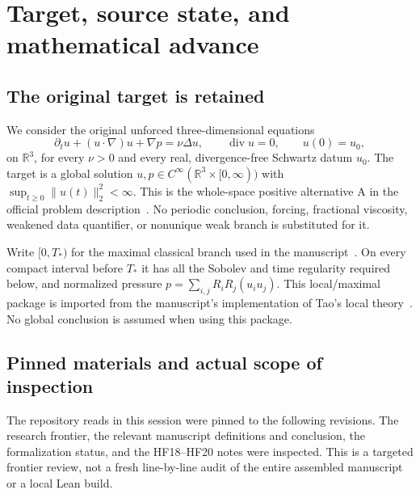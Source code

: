 \documentclass[11pt,a4paper]{article}
\theoremstyle{definition}
\newcommand{\R}{\mathbb R}
\DeclareMathOperator{\diver}{div}
\begin{document}
\begingroup
\small
\setlength{\parskip}{0pt}
\tableofcontents
\endgroup
\newpage

\section{Target, source state, and mathematical advance}\label{sec:provenance}

\subsection{The original target is retained}
We consider the original unforced three-dimensional equations
\begin{equation}\label{eq:NS}
 \partial_tu+(u\cdot\nabla)u+\nabla p=\nu\Delta u,
 \qquad \diver u=0,\qquad u(0)=u_0,
\end{equation}
on $\R^3$, for every $\nu>0$ and every real, divergence-free Schwartz datum $u_0$. The target is a global solution $u,p\in C^\infty(\R^3\times[0,\infty))$ with $\sup_{t\ge0}\|u(t)\|_2^2<\infty$. This is the whole-space positive alternative A in the official problem description~\cite{Clay}. No periodic conclusion, forcing, fractional viscosity, weakened data quantifier, or nonunique weak branch is substituted for it.

Write $[0,T_*)$ for the maximal classical branch used in the manuscript~\cite{Paper}. On every compact interval before $T_*$ it has all the Sobolev and time regularity required below, and normalized pressure $p=\sum_{i,j}R_iR_j(u_i u_j)$. This local/maximal package is imported from the manuscript's implementation of Tao's local theory~\cite{Tao}. No global conclusion is assumed when using this package.

\subsection{Pinned materials and actual scope of inspection}
The repository reads in this session were pinned to the following revisions. The research frontier, the relevant manuscript definitions and conclusion, the formalization status, and the HF18--HF20 notes were inspected. This is a targeted frontier review, not a fresh line-by-line audit of the entire assembled manuscript or a local Lean build.
\end{document}
